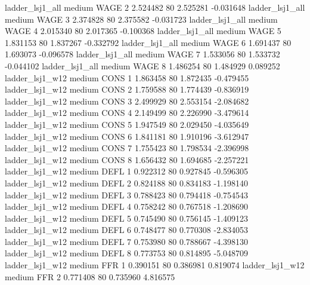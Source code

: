     ladder_lsj1_all     medium     WAGE                 2  2.524482 80       2.525281          -0.031648
    ladder_lsj1_all     medium     WAGE                 3  2.374828 80       2.375582          -0.031723
    ladder_lsj1_all     medium     WAGE                 4  2.015340 80       2.017365          -0.100368
    ladder_lsj1_all     medium     WAGE                 5  1.831153 80       1.837267          -0.332792
    ladder_lsj1_all     medium     WAGE                 6  1.691437 80       1.693073          -0.096578
    ladder_lsj1_all     medium     WAGE                 7  1.533056 80       1.533732          -0.044102
    ladder_lsj1_all     medium     WAGE                 8  1.486254 80       1.484929           0.089252
    ladder_lsj1_w12     medium     CONS                 1  1.863458 80       1.872435          -0.479455
    ladder_lsj1_w12     medium     CONS                 2  1.759588 80       1.774439          -0.836919
    ladder_lsj1_w12     medium     CONS                 3  2.499929 80       2.553154          -2.084682
    ladder_lsj1_w12     medium     CONS                 4  2.149499 80       2.226990          -3.479614
    ladder_lsj1_w12     medium     CONS                 5  1.947549 80       2.029450          -4.035649
    ladder_lsj1_w12     medium     CONS                 6  1.841181 80       1.910196          -3.612947
    ladder_lsj1_w12     medium     CONS                 7  1.755423 80       1.798534          -2.396998
    ladder_lsj1_w12     medium     CONS                 8  1.656432 80       1.694685          -2.257221
    ladder_lsj1_w12     medium     DEFL                 1  0.922312 80       0.927845          -0.596305
    ladder_lsj1_w12     medium     DEFL                 2  0.824188 80       0.834183          -1.198140
    ladder_lsj1_w12     medium     DEFL                 3  0.788423 80       0.794418          -0.754543
    ladder_lsj1_w12     medium     DEFL                 4  0.758242 80       0.767518          -1.208690
    ladder_lsj1_w12     medium     DEFL                 5  0.745490 80       0.756145          -1.409123
    ladder_lsj1_w12     medium     DEFL                 6  0.748477 80       0.770308          -2.834053
    ladder_lsj1_w12     medium     DEFL                 7  0.753980 80       0.788667          -4.398130
    ladder_lsj1_w12     medium     DEFL                 8  0.773753 80       0.814895          -5.048709
    ladder_lsj1_w12     medium      FFR                 1  0.390151 80       0.386981           0.819074
    ladder_lsj1_w12     medium      FFR                 2  0.771408 80       0.735960           4.816575
